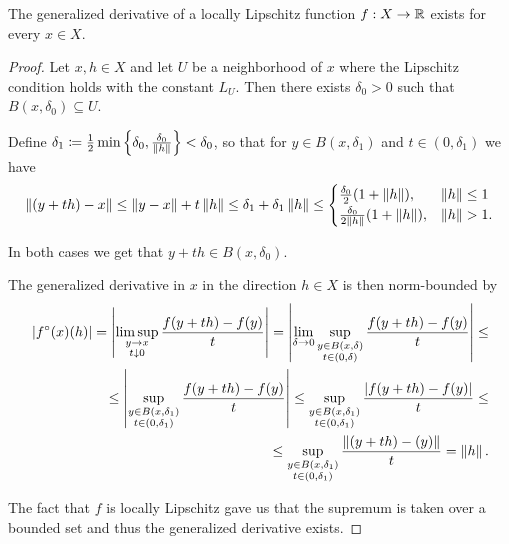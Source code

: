 \begin{proposition}\label{thm:clarke_derivative_exists}
  The generalized derivative of a locally Lipschitz function $f: X \to \mathbb R$ exists for every $x \in X$.
\end{proposition}
\begin{proof}
  Let $x, h \in X$ and let $U$ be a neighborhood of $x$ where the Lipschitz condition holds with the constant $L_U$. Then there exists $\delta_0 > 0$ such that $B(x, \delta_0) \subseteq U$.

  Define $\delta_1 \coloneqq \frac 1 2 \min \left\{\delta_0, \frac {\delta_0} {\left\Vert h \right\Vert} \right\} < \delta_0$, so that for $y \in B(x, \delta_1)$ and $t \in (0, \delta_1)$ we have
  \begin{align*}
    \left\Vert (y + th) - x \right\Vert
    \leq
    \left\Vert y - x \right\Vert + t \left\Vert h \right\Vert
    \leq
    \delta_1 + \delta_1 \left\Vert h \right\Vert
    \leq
    \begin{cases}
      \frac {\delta_0} 2 (1 + \left\Vert h \right\Vert), &\left\Vert h \right\Vert \leq 1 \\
      \frac {\delta_0} {2 \left\Vert h \right\Vert} (1 + \left\Vert h \right\Vert), &\left\Vert h \right\Vert > 1.
    \end{cases}
  \end{align*}

  In both cases we get that $y + th \in B(x, \delta_0)$.

  The generalized derivative in $x$ in the direction $h \in X$ is then norm-bounded by
  \begin{align*}
    \left\vert f^\circ(x)(h) \right\vert
    =
    \left\vert \limsup_{\substack{y \to x \\ t \downarrow 0}} \frac {f(y + th) - f(y)} t \right\vert
    =
    \left\vert \lim_{\delta \to 0} \sup_{\substack{y \in B(x, \delta) \\ t \in (0, \delta)}} \frac {f(y + th) - f(y)} t \right\vert
    \leq \\ \leq
    \left\vert \sup_{\substack{y \in B(x, \delta_1) \\ t \in (0, \delta_1)}} \frac {f(y + th) - f(y)} t \right\vert
    \leq
    \sup_{\substack{y \in B(x, \delta_1) \\ t \in (0, \delta_1)}} \frac {\left\vert f(y + th) - f(y) \right\vert} t
    \leq \\ \leq
    \sup_{\substack{y \in B(x, \delta_1) \\ t \in (0, \delta_1)}} \frac {\left\Vert (y + th) - (y) \right\Vert} t
    =
    \left\Vert h \right\Vert.
  \end{align*}

  The fact that $f$ is locally Lipschitz gave us that the supremum is taken over a bounded set and thus the generalized derivative exists.
\end{proof}
